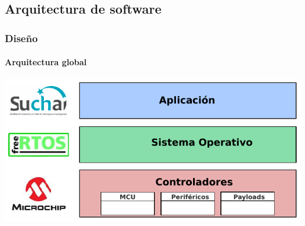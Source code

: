 \documentclass[xcolor=dvipsnames]{beamer}
\begin{document}
    \subsection{Arquitectura de software}
    \begin{frame}
        \frametitle{Diseño}
        \framesubtitle{Arquitectura global}
        
        \centering
        \includegraphics[width=0.99\textwidth]{img/arquitectura_global.pdf}

    \end{frame}
    
%         
%         
    
\end{document}
